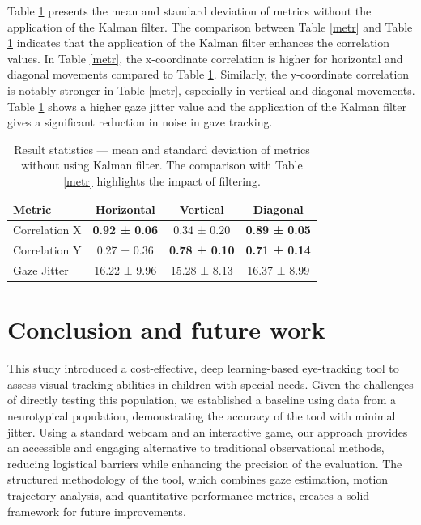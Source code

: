 \documentclass[10pt,a4paper,twoside]{article}
\begin{document}
Table \ref{metr1} presents the mean and standard deviation of metrics without the application of the Kalman filter. The comparison between Table \ref{metr} and Table \ref{metr1} indicates that the application of the Kalman filter enhances the correlation values. In Table \ref{metr}, the x-coordinate correlation is higher for horizontal and diagonal movements compared to Table \ref{metr1}. Similarly, the y-coordinate correlation is notably stronger in Table \ref{metr}, especially in vertical and diagonal movements. Table \ref{metr1} shows a higher gaze jitter value and the application of the Kalman filter gives a significant reduction in noise in gaze tracking.

\begin{table}[h!]
    \centering
    \begin{tabular}{lccc}
        \toprule
        Metric & Horizontal & Vertical & Diagonal \\
        \midrule
        Correlation X & \textbf{0.92 ± 0.06} & 0.34 ± 0.20 & \textbf{0.89 ± 0.05}\\
        Correlation Y & 0.27 ± 0.36 & \textbf{0.78 ± 0.10} & \textbf{0.71 ± 0.14}\\
        Gaze Jitter & 16.22 ± 9.96 & 15.28 ± 8.13 & 16.37 ± 8.99 \\
        \bottomrule

    \end{tabular}
     \caption{Result statistics — mean and standard deviation of metrics without using Kalman filter. The comparison with Table \ref{metr} highlights the impact of filtering. }
      \label{metr1}
\end{table}

\section{Conclusion and future work}
\label{conclusion}

This study introduced a cost-effective, deep learning-based eye-tracking tool to assess visual tracking abilities in children with special needs. Given the challenges of directly testing this population, we established a baseline using data from a neurotypical population, demonstrating the accuracy of the tool with minimal jitter. Using a standard webcam and an interactive game, our approach provides an accessible and engaging alternative to traditional observational methods, reducing logistical barriers while enhancing the precision of the evaluation. The structured methodology of the tool, which combines gaze estimation, motion trajectory analysis, and quantitative performance metrics, creates a solid framework for future improvements.
\end{document}
